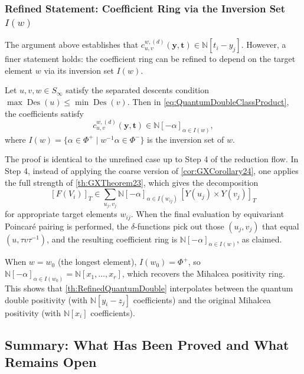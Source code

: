 \bigskip

\subsubsection{Refined Statement: Coefficient Ring via the Inversion Set $I(w)$}
\label{sec:RefinedCoefficientRingProof}

The argument above establishes that $c_{u,v}^{w,(d)}(\mathbf{y},\mathbf{t}) \in \mathbb{N}[t_i - y_j]$. However, a finer statement holds: the coefficient ring can be refined to depend on the target element $w$ via its inversion set $I(w)$.

\begin{Theorem}\label{th:RefinedQuantumDouble}
Let $u, v, w \in S_\infty$ satisfy the separated descents condition $\max\operatorname{Des}(u) \leq \min\operatorname{Des}(v)$. Then in \cref{eq:QuantumDoubleClassProduct}, the coefficients satisfy
$$c_{u,v}^{w,(d)}(\mathbf{y},\mathbf{t}) \in \mathbb{N}[-\alpha]_{\alpha \in I(w)},$$
where $I(w) = \{\alpha \in \Phi^+ \mid w^{-1}\alpha \in \Phi^-\}$ is the inversion set of $w$.
\end{Theorem}

\begin{Proof}
The proof is identical to the unrefined case up to Step 4 of the reduction flow. In Step 4, instead of applying the coarse version of \cref{cor:GXCorollary24}, one applies the full strength of \cref{th:GXTheorem23}, which gives the decomposition
$$[F(V_i)]_T \in \sum_{u_j, v_j} \mathbb{N}[-\alpha]_{\alpha \in I(w_{ij})}\, [Y(u_j) \times Y(v_j)]_T$$
for appropriate target elements $w_{ij}$. When the final evaluation by equivariant Poincar\'e pairing is performed, the $\delta$-functions pick out those $(u_j, v_j)$ that equal $(u, \tau v \tau^{-1})$, and the resulting coefficient ring is $\mathbb{N}[-\alpha]_{\alpha \in I(w)}$, as claimed.
\end{Proof}

When $w = w_0$ (the longest element), $I(w_0) = \Phi^+$, so $\mathbb{N}[-\alpha]_{\alpha \in I(w_0)} = \mathbb{N}[x_1,\ldots,x_r]$, which recovers the Mihalcea positivity ring. This shows that \cref{th:RefinedQuantumDouble} interpolates between the quantum double positivity (with $\mathbb{N}[y_i-z_j]$ coefficients) and the original Mihalcea positivity (with $\mathbb{N}[x_i]$ coefficients).



\subsection{Summary: What Has Been Proved and What Remains Open}
\label{sec:ProofSummary}

